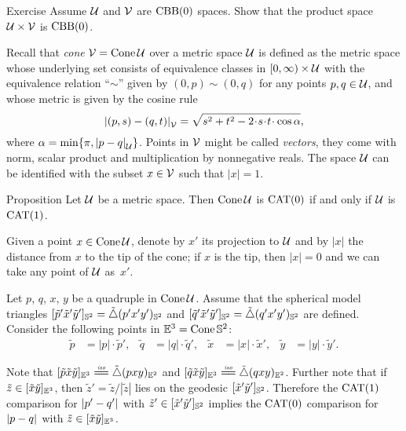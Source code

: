 \begin{thm}{Exercise}\label{ex:product-CBB}
Assume $\mathcal{U}$ and $\mathcal{V}$ are $\mathrm{CBB}(0)$ spaces.
Show that the product space $\mathcal{U}\times\mathcal{V}$ is $\mathrm{CBB}(0)$.
\end{thm}

Recall that \label{page:cone}\emph{cone} $\mathcal{V}=\mathop{\rm Cone}\nolimits\mathcal{U}$ over a metric space $\mathcal{U}$
is defined as the metric space whose underlying set consists of
equivalence classes in
$[0,\infty)\times \mathcal{U}$ with the equivalence relation ``$\sim$'' given by $(0,p)\sim (0,q)$ for any points $p,q\in\mathcal{U}$,
and whose metric is given by the cosine rule
\[
\dist{(p,s)}{(q,t)}{\spc{V}} 
=
\sqrt{s^2+t^2-2\cdot s\cdot t\cdot \cos\alpha},
\]
where $\alpha= \min\{\pi, \dist{p}{q}{\spc{U}}\}$.
Points in $\mathcal{V}$ might be called \emph{vectors},
they come with norm, scalar product and multiplication by nonnegative reals.
The space $\mathcal{U}$ can be identified with the subset $x\in \mathcal{V}$ such that $|x|=1$.

\begin{thm}{Proposition}\label{ex:cone+susp}
Let $\mathcal{U}$ be a metric space.
Then $\mathop{\rm Cone}\nolimits\mathcal{U}$ is  $\mathrm{CAT}(0)$ if and only if $\mathcal{U}$ is $\mathrm{CAT}(1)$.
\end{thm}

Given a point $x\in \mathop{\rm Cone}\nolimits\mathcal{U}$, denote by $x'$ its projection to $\mathcal{U}$
and by $|x|$ the distance from $x$ to the tip of the cone;
if $x$ is the tip, then $|x|=0$ and we can take any point of $\mathcal{U}$ as~$x'$.

Let $p$, $q$, $x$, $y$
be a quadruple in $\mathop{\rm Cone}\nolimits\mathcal{U}$.
Assume that the spherical model triangles $[\tilde p'\tilde x'\tilde y']_{\mathbb{S}^2}=\tilde\triangle(p'x'y')_{\mathbb{S}^2}$ and $[\tilde q'\tilde x'\tilde y']_{\mathbb{S}^2}=\tilde\triangle(q'x'y')_{\mathbb{S}^2}$ are defined.
Consider the following points in $\mathbb{E}^3=\mathop{\rm Cone}\nolimits\mathbb{S}^2$: 
\begin{align*}
\tilde p&=|p|\cdot\tilde p',
&
\tilde q&=|q|\cdot\tilde q',
&
\tilde x&=|x|\cdot\tilde x',
&
\tilde y&=|y|\cdot\tilde y'.
\end{align*}

Note that
$\trig{\tilde p}{\tilde x}{\tilde y}_{\EE^3}\iso\modtrig(pxy)_{\EE^2}$
and
$\trig{\tilde q}{\tilde x}{\tilde y}_{\EE^3}\iso\modtrig(qxy)_{\EE^2}$.
Further note that if $\tilde z\in [\tilde x\tilde y]_{\mathbb{E}^3}$, then
$\tilde z'=\tilde z/|\tilde z|$ lies on the geodesic $[\tilde x'\tilde y']_{\mathbb{S}^2}$.
Therefore the $\mathrm{CAT}(1)$ comparison for $\dist{p'}{q'}{}$ with $\tilde z'\in[\tilde x'\tilde y']_{\mathbb{S}^2}$ implies the 
$\mathrm{CAT}(0)$ comparison for $\dist{p}{q}{}$ with $\tilde z\in[\tilde x\tilde y]_{\mathbb{E}^3}$.

